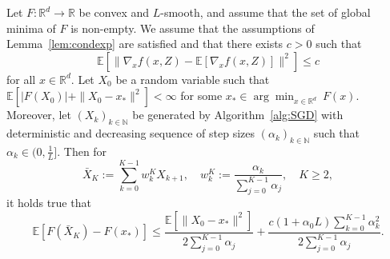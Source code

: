 \documentclass[12pt,openany]{book}
\theoremstyle{definition}
\theoremstyle{definition}
\newcommand{\E}{\mathbb{E}}
\newcommand{\N}{\mathbb{N}}
\newcommand{\R}{\mathbb{R}}
\begin{document}
\begin{thm} \label{thm:SGD_convex}
Let $F:\R^d\to\R$ be convex and $L$-smooth, and assume that the set of global minima of $F$ is non-empty. We assume that the assumptions of Lemma~\ref{lem:condexp} are satisfied and that there exists $c>0$ such that
\[\E[\|\nabla_x f(x,Z)-\E[\nabla_x f(x,Z)]\|^2]\le c \]
for all $x\in\R^d$. Let $X_0$ be a random variable such that $\E[|F(X_0)|+\|X_0-x_\ast\|^2]<\infty$ for some $x_\ast\in\arg\min_{x\in\R^d}\ F(x)$. Moreover, let $(X_k)_{k\in\N}$ be generated by Algorithm~\ref{alg:SGD} with deterministic and decreasing sequence of step sizes $(\alpha_k)_{k\in\N}$ such that $\alpha_k\in(0,\frac1L]$. Then for
\[\bar X_K := \sum_{k=0}^{K-1}w_k^K X_{k+1},\quad w_k^K:= \frac{\alpha_k}{\sum_{j=0}^{K-1}\alpha_j}, \quad K\ge2, \]
it holds true that
\[\E[F(\bar X_K)-F(x_\ast)] \le \frac{\E[\|X_0-x_\ast\|^2]}{2\sum_{j=0}^{K-1}\alpha_j} + \frac{c(1+\alpha_0 L)\sum_{k=0}^{K-1} \alpha_k^2 }{2\sum_{j=0}^{K-1}\alpha_j}.\]
\end{thm}
\end{document}

